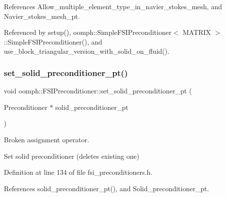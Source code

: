 References Allow\+\_\+multiple\+\_\+element\+\_\+type\+\_\+in\+\_\+navier\+\_\+stokes\+\_\+mesh, and Navier\+\_\+stokes\+\_\+mesh\+\_\+pt.



Referenced by setup(), oomph\+::\+Simple\+F\+S\+I\+Preconditioner$<$ M\+A\+T\+R\+I\+X $>$\+::\+Simple\+F\+S\+I\+Preconditioner(), and use\+\_\+block\+\_\+triangular\+\_\+version\+\_\+with\+\_\+solid\+\_\+on\+\_\+fluid().

\mbox{\label{classoomph_1_1FSIPreconditioner_a0f21e38e18521e0946c3f3ec98a85baa}} 
\subsubsection{\texorpdfstring{set\+\_\+solid\+\_\+preconditioner\+\_\+pt()}{set\_solid\_preconditioner\_pt()}}
{\footnotesize\ttfamily void oomph\+::\+F\+S\+I\+Preconditioner\+::set\+\_\+solid\+\_\+preconditioner\+\_\+pt (\begin{DoxyParamCaption}\item[{Preconditioner $\ast$}]{solid\+\_\+preconditioner\+\_\+pt }\end{DoxyParamCaption})\hspace{0.3cm}{\ttfamily [inline]}}



Broken assignment operator. 

Set solid preconditioner (deletes existing one) 

Definition at line 134 of file fsi\+\_\+preconditioners.\+h.



References solid\+\_\+preconditioner\+\_\+pt(), and Solid\+\_\+preconditioner\+\_\+pt.

\mbox{\label{classoomph_1_1FSIPreconditioner_a61d583e9d3a1596efe22b11950fb47a5}} 
